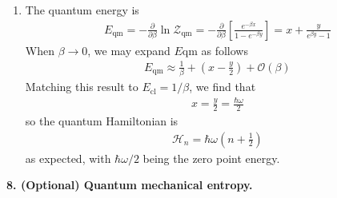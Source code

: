 \documentclass{article}
\theoremstyle{definition}
\newcommand{\p}{\partial}
\newcommand{\ham}{\mathcal{H}}
\newcommand{\be}{\beta}
\newcommand{\f}[2]{\frac{#1}{#2}}
\newcommand{\lp}{\left(}
\newcommand{\rp}{\right)}
\newcommand{\lb}{\left[}
\newcommand{\rb}{\right]}
\begin{document}
\begin{enumerate}[label=(\alph*)]
	
	
	\item The quantum energy is 
	\begin{align*}
	E_\text{qm} = -\f{\p}{\p \be}\ln \mathcal{Z}_\text{qm} = -\f{\p}{\p \be} \lb \f{e^{-\be x}}{ 1 - e^{-\be y}}  \rb = \boxed{x + \f{y}{e^{\be y} - 1}}
	\end{align*}
	When $\be \to 0$, we may expand $E\text{qm}$ as follows 
	\begin{align*}
	E_\text{qm} \approx \f{1}{\be} + \lp x - \f{y}{2}  \rp + \mathcal{O}(\be)	
	\end{align*}
	Matching this result to $E_\text{cl} = 1/\be$, we find that
	\begin{align*}
	x = \f{y}{2} = \boxed{\f{\hbar \omega}{2}}
	\end{align*}
	so the quantum Hamiltonian is 
	\begin{align*}
	\ham_n = \hbar \omega\lp n + \f{1}{2} \rp
	\end{align*}
	as expected, with $\hbar\omega/2$ being the zero point energy. 
\end{enumerate}

\noindent \textbf{8. (Optional) Quantum mechanical entropy.}
\end{document}
